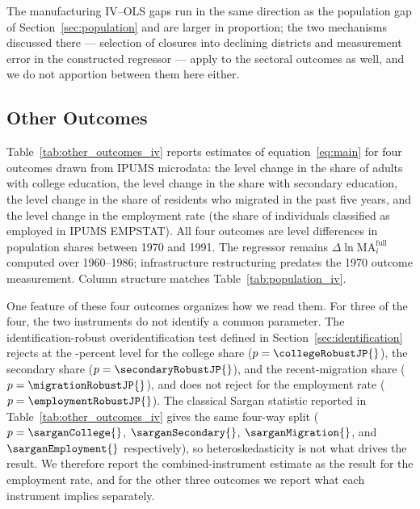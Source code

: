 The manufacturing IV--OLS gaps run in the same direction as the
population gap of Section~\ref{sec:population} and are larger in
proportion; the two mechanisms discussed there --- selection of
closures into declining districts and measurement error in the
constructed regressor --- apply to the sectoral outcomes as well,
and we do not apportion between them here either.



\subsection{Other Outcomes}
\label{sec:other_outcomes}

Table~\ref{tab:other_outcomes_iv} reports estimates of
equation~\eqref{eq:main} for four outcomes drawn from IPUMS
microdata: the level change in the share of adults with college
education, the level change in the share with secondary education,
the level change in the share of residents who migrated in the past
five years, and the level change in the employment rate (the share
of individuals classified as employed in IPUMS EMPSTAT). All four
outcomes are level differences in population shares between 1970 and
1991. The regressor remains $\Delta \ln \mathrm{MA}^{\mathrm{full}}_i$
computed over 1960--1986; infrastructure restructuring predates the
1970 outcome measurement. Column structure matches
Table~\ref{tab:population_iv}.

One feature of these four outcomes organizes how we read them. For
three of the four, the two instruments do not identify a common
parameter. The identification-robust overidentification test defined
in Section~\ref{sec:identification} rejects at the
\overidAlpha{}-percent level for the college share
($p=\collegeRobustJP{}$), the secondary share
($p=\secondaryRobustJP{}$), and the recent-migration share
($p=\migrationRobustJP{}$), and does not reject for the employment
rate ($p=\employmentRobustJP{}$). The classical Sargan statistic
reported in Table~\ref{tab:other_outcomes_iv} gives the same four-way
split ($p=\sarganCollege{}$, $\sarganSecondary{}$,
$\sarganMigration{}$, and $\sarganEmployment{}$ respectively), so
heteroskedasticity is not what drives the result. We therefore report
the combined-instrument estimate as the result for the employment
rate, and for the other three outcomes we report what each instrument
implies separately.


